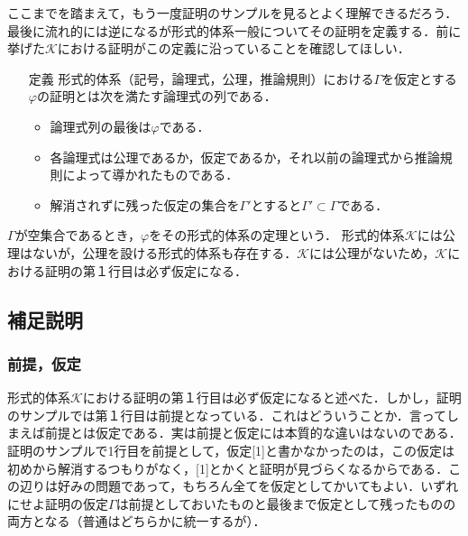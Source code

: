 \documentclass[10pt,b5paper,papersize,dvipdfmx]{jsbook}
\begin{document}
ここまでを踏まえて，もう一度証明のサンプルを見るとよく理解できるだろう．最後に流れ的には逆になるが形式的体系一般についてその証明を定義する．前に挙げた$\mathcal K$における証明がこの定義に沿っていることを確認してほしい．
\begin{itemize}
\item[定義] 形式的体系（記号，論理式，公理，推論規則）における$\Gamma$を仮定とする$\varphi$の証明とは次を満たす論理式の列である．
\begin{itemize}
\item 論理式列の最後は$\varphi$である．
\item 各論理式は公理であるか，仮定であるか，それ以前の論理式から推論規則によって導かれたものである．
\item 解消されずに残った仮定の集合を$\Gamma'$とすると$\Gamma'\subset \Gamma$である．
\end{itemize}
\end{itemize}
$\Gamma$が空集合であるとき，$\varphi$をその形式的体系の定理という．
形式的体系$\mathcal K$には公理はないが，公理を設ける形式的体系も存在する．$\mathcal K$には公理がないため，$\mathcal K$における証明の第１行目は必ず仮定になる．

\subsection{補足説明}
\subsubsection{前提，仮定}
形式的体系$\mathcal K$における証明の第１行目は必ず仮定になると述べた．しかし，証明のサンプルでは第１行目は前提となっている．これはどういうことか．言ってしまえば前提とは仮定である．実は前提と仮定には本質的な違いはないのである．証明のサンプルで1行目を前提として，仮定[1]と書かなかったのは，この仮定は初めから解消するつもりがなく，[1]とかくと証明が見づらくなるからである．この辺りは好みの問題であって，もちろん全てを仮定としてかいてもよい．いずれにせよ証明の仮定$\Gamma$は前提としておいたものと最後まで仮定として残ったものの両方となる（普通はどちらかに統一するが）．
\end{document}
